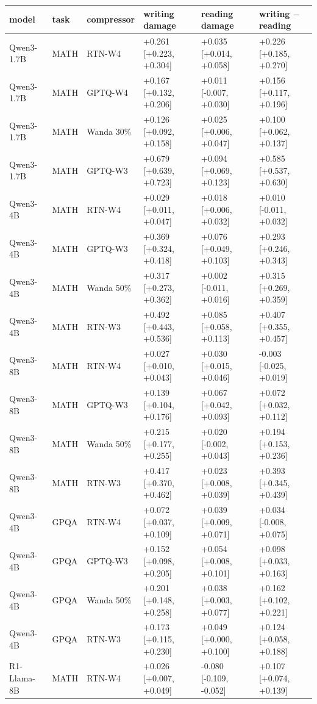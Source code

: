 \begin{tabular}{llllll}
\toprule
model & task & compressor & writing damage & reading damage & writing $-$ reading \\
\midrule
Qwen3-1.7B & MATH & RTN-W4 & +0.261 [+0.223, +0.304] & +0.035 [+0.014, +0.058] & +0.226 [+0.185, +0.270] \\
Qwen3-1.7B & MATH & GPTQ-W4 & +0.167 [+0.132, +0.206] & +0.011 [-0.007, +0.030] & +0.156 [+0.117, +0.196] \\
Qwen3-1.7B & MATH & Wanda 30\% & +0.126 [+0.092, +0.158] & +0.025 [+0.006, +0.047] & +0.100 [+0.062, +0.137] \\
Qwen3-1.7B & MATH & GPTQ-W3 & +0.679 [+0.639, +0.723] & +0.094 [+0.069, +0.123] & +0.585 [+0.537, +0.630] \\
Qwen3-4B & MATH & RTN-W4 & +0.029 [+0.011, +0.047] & +0.018 [+0.006, +0.032] & +0.010 [-0.011, +0.032] \\
Qwen3-4B & MATH & GPTQ-W3 & +0.369 [+0.324, +0.418] & +0.076 [+0.049, +0.103] & +0.293 [+0.246, +0.343] \\
Qwen3-4B & MATH & Wanda 50\% & +0.317 [+0.273, +0.362] & +0.002 [-0.011, +0.016] & +0.315 [+0.269, +0.359] \\
Qwen3-4B & MATH & RTN-W3 & +0.492 [+0.443, +0.536] & +0.085 [+0.058, +0.113] & +0.407 [+0.355, +0.457] \\
Qwen3-8B & MATH & RTN-W4 & +0.027 [+0.010, +0.043] & +0.030 [+0.015, +0.046] & -0.003 [-0.025, +0.019] \\
Qwen3-8B & MATH & GPTQ-W3 & +0.139 [+0.104, +0.176] & +0.067 [+0.042, +0.093] & +0.072 [+0.032, +0.112] \\
Qwen3-8B & MATH & Wanda 50\% & +0.215 [+0.177, +0.255] & +0.020 [-0.002, +0.043] & +0.194 [+0.153, +0.236] \\
Qwen3-8B & MATH & RTN-W3 & +0.417 [+0.370, +0.462] & +0.023 [+0.008, +0.039] & +0.393 [+0.345, +0.439] \\
Qwen3-4B & GPQA & RTN-W4 & +0.072 [+0.037, +0.109] & +0.039 [+0.009, +0.071] & +0.034 [-0.008, +0.075] \\
Qwen3-4B & GPQA & GPTQ-W3 & +0.152 [+0.098, +0.205] & +0.054 [+0.008, +0.101] & +0.098 [+0.033, +0.163] \\
Qwen3-4B & GPQA & Wanda 50\% & +0.201 [+0.148, +0.258] & +0.038 [+0.003, +0.077] & +0.162 [+0.102, +0.221] \\
Qwen3-4B & GPQA & RTN-W3 & +0.173 [+0.115, +0.230] & +0.049 [+0.000, +0.100] & +0.124 [+0.058, +0.188] \\
R1-Llama-8B & MATH & RTN-W4 & +0.026 [+0.007, +0.049] & -0.080 [-0.109, -0.052] & +0.107 [+0.074, +0.139] \\

\end{tabular}
